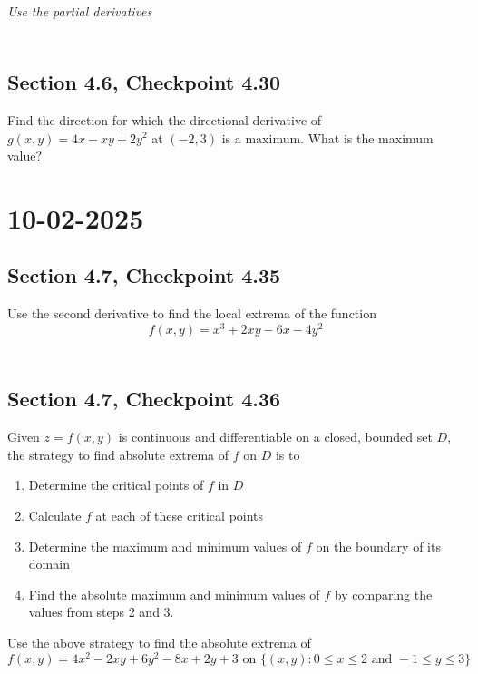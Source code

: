 \documentclass[]{mangos-musings}
\begin{document}
\textit{Use the partial derivatives}
\begin{align*}
  \\ \\ \\
\end{align*}

\subsection{Section 4.6, Checkpoint 4.30}
Find the direction for which the directional derivative of $g(x, y) = 4x - xy + 2y^2$ at $(-2, 3)$ is a maximum. What is the maximum value?


\newpage
\section{10-02-2025}
\subsection{Section 4.7, Checkpoint 4.35}
Use the second derivative to find the local extrema of the function 
\[f(x, y) = x^3 + 2xy - 6x - 4y^2\]
\begin{align*}
  \\ \\ \\
\end{align*}
\subsection{Section 4.7, Checkpoint 4.36}
Given $z = f(x, y)$ is continuous and differentiable on a closed, bounded set $D$, the strategy to find absolute extrema of $f$ on $D$ is to 
\begin{enumerate}
  \item Determine the critical points of $f$ in $D$
  \item Calculate $f$ at each of these critical points
  \item Determine the maximum and minimum values of $f$ on the boundary of its domain 
  \item Find the absolute maximum and minimum values of $f$ by comparing the values from steps 2 and 3.
\end{enumerate}
Use the above strategy to find the absolute extrema of
\[f(x, y) = 4x^2 - 2xy + 6y^2 - 8x + 2y + 3 \text{ on }\{(x, y) : 0 \le x \le 2 \text{ and } -1 \le y \le 3\}\]
\end{document}
